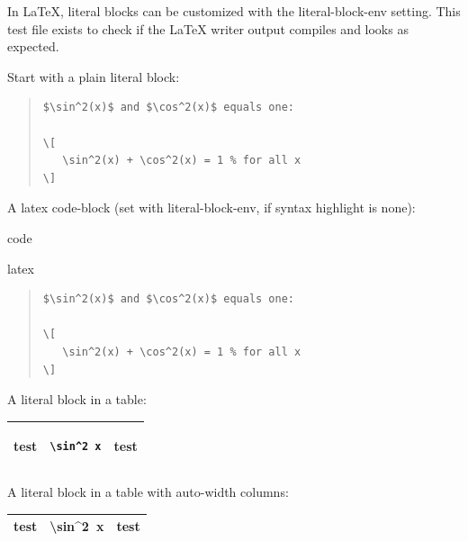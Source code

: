 \documentclass[a4paper]{article}
\newlength{\DUtablewidth} %
\newlength{\ttemwidth}
\begin{document}
In LaTeX, literal blocks can be customized with the \textquotedbl{}literal-block-env\textquotedbl{}
setting. This test file exists to check if the LaTeX writer output compiles
and looks as expected.

Start with a plain literal block:

\begin{quote}
\begin{verbatim}
$\sin^2(x)$ and $\cos^2(x)$ equals one:

\[
   \sin^2(x) + \cos^2(x) = 1 % for all x
\]
\end{verbatim}
\end{quote}

A latex \textquotedbl{}code-block\textquotedbl{} (set with \textquotedbl{}literal-block-env\textquotedbl{}, if syntax
highlight is \textquotedbl{}none\textquotedbl{}):

\begin{DUclass}{code}
\begin{DUclass}{latex}
\begin{quote}
\begin{verbatim}
$\sin^2(x)$ and $\cos^2(x)$ equals one:

\[
   \sin^2(x) + \cos^2(x) = 1 % for all x
\]
\end{verbatim}
\end{quote}
\end{DUclass}
\end{DUclass}

A literal block in a table:

\setlength{\DUtablewidth}{\linewidth}%
\begin{longtable*}{|p{0.063\DUtablewidth}|p{0.145\DUtablewidth}|p{0.063\DUtablewidth}|}
\hline

test
 & 
\begin{minipage}{8\ttemwidth}
\begin{verbatim}
\sin^2 x
\end{verbatim}
\end{minipage}
 & 
test
 \\
\hline
\end{longtable*}

A literal block in a table with auto-width columns:

\begin{longtable*}{|l|l|l|}
\hline
test & 
\ttfamily\raggedright
\textbackslash{}sin\textasciicircum{}2~x
 & test \\
\hline
\end{longtable*}
\end{document}
